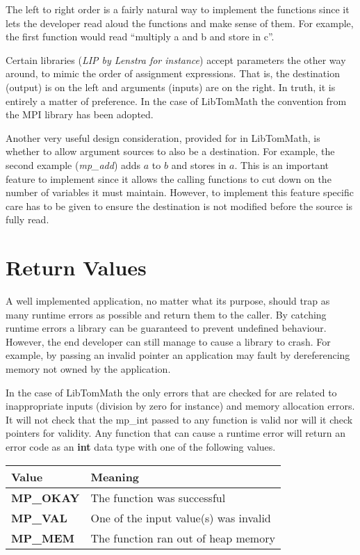 \documentclass[b5paper]{book}
\begin{document}
The left to right order is a fairly natural way to implement the functions since it lets the developer read aloud the
functions and make sense of them.  For example, the first function would read ``multiply a and b and store in c''.

Certain libraries (\textit{LIP by Lenstra for instance}) accept parameters the other way around, to mimic the order
of assignment expressions.  That is, the destination (output) is on the left and arguments (inputs) are on the right.  In 
truth, it is entirely a matter of preference.  In the case of LibTomMath the convention from the MPI library has been 
adopted.  

Another very useful design consideration, provided for in LibTomMath, is whether to allow argument sources to also be a 
destination.  For example, the second example (\textit{mp\_add}) adds $a$ to $b$ and stores in $a$.  This is an important 
feature to implement since it allows the calling functions to cut down on the number of variables it must maintain.  
However, to implement this feature specific care has to be given to ensure the destination is not modified before the 
source is fully read.

\section{Return Values}
A well implemented application, no matter what its purpose, should trap as many runtime errors as possible and return them 
to the caller.  By catching runtime errors a library can be guaranteed to prevent undefined behaviour.  However, the end 
developer can still manage to cause a library to crash.  For example, by passing an invalid pointer an application may
fault by dereferencing memory not owned by the application.

In the case of LibTomMath the only errors that are checked for are related to inappropriate inputs (division by zero for 
instance) and memory allocation errors.  It will not check that the mp\_int passed to any function is valid nor 
will it check pointers for validity.  Any function that can cause a runtime error will return an error code as an 
\textbf{int} data type with one of the following values.

  
\begin{center}
\begin{tabular}{|l|l|}
\hline \textbf{Value} & \textbf{Meaning} \\
\hline \textbf{MP\_OKAY} & The function was successful \\
\hline \textbf{MP\_VAL}  & One of the input value(s) was invalid \\
\hline \textbf{MP\_MEM}  & The function ran out of heap memory \\
\hline
\end{tabular}
\end{center}
\end{document}
